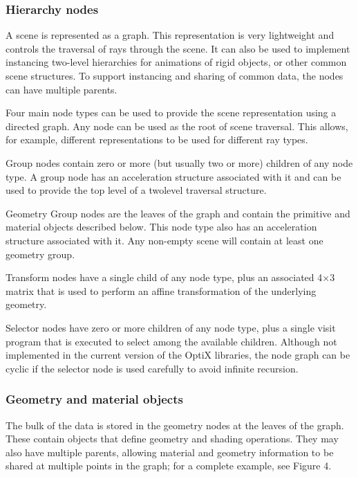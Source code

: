 \subsubsection{Hierarchy nodes}

A scene is represented as a graph. This representation is very
lightweight and controls the traversal of rays through the scene. It
can also be used to implement instancing two-level hierarchies for
animations of rigid objects, or other common scene structures. To
support instancing and sharing of common data, the nodes can have
multiple parents.

Four main node types can be used to provide the scene representation using a directed graph. Any node can be used as the root of
scene traversal. This allows, for example, different representations
to be used for different ray types.

Group nodes contain zero or more (but usually two or more) children of any node type. A group node has an acceleration structure
associated with it and can be used to provide the top level of a twolevel traversal structure.

Geometry Group nodes are the leaves of the graph and contain the
primitive and material objects described below. This node type also
has an acceleration structure associated with it. Any non-empty
scene will contain at least one geometry group.

Transform nodes have a single child of any node type, plus an associated 4×3 matrix that is used to perform an affine transformation
of the underlying geometry.

Selector nodes have zero or more children of any node type, plus a
single visit program that is executed to select among the available
children. Although not implemented in the current version of the
OptiX libraries, the node graph can be cyclic if the selector node is
used carefully to avoid infinite recursion.

\subsubsection{Geometry and material objects}

The bulk of the data is stored in the geometry nodes at the leaves of
the graph. These contain objects that define geometry and shading
operations. They may also have multiple parents, allowing material
and geometry information to be shared at multiple points in the
graph; for a complete example, see Figure 4.

